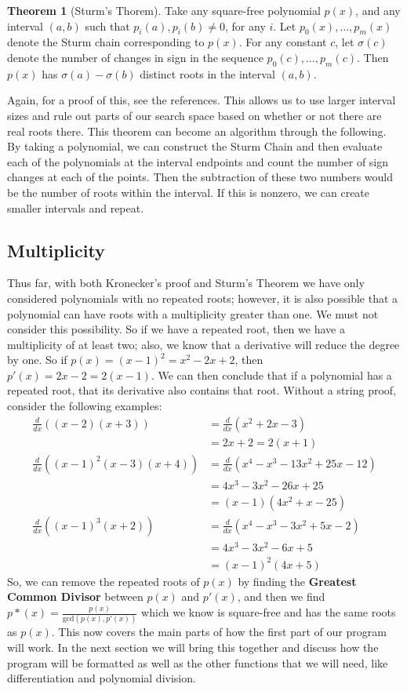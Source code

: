 \documentclass[]{article}
\theoremstyle{definition}
\newtheorem{theorem}{Theorem}[section]
\begin{document}
\begin{theorem}[Sturm's Thorem]
\label{sturm_thm}
Take any square-free polynomial $p(x)$, and any interval $(a, b)$ such that $p_i(a), p_i(b) \neq 0$, for any $i$. Let $p_0(x), \ldots, p_m(x)$ denote the Sturm chain corresponding to $p(x)$. For any constant $c$, let $\sigma(c)$ denote the number of changes in sign in the sequence $p_0(c), \ldots, p_m(c)$. Then $p(x)$ has $\sigma(a) - \sigma(b)$ distinct roots in the interval $(a, b)$.
\end{theorem}
Again, for a proof of this, see the references. This allows us to use larger interval sizes and rule out parts of our search space based on whether or not there are real roots there. This theorem can become an algorithm through the following. By taking a polynomial, we can construct the Sturm Chain and then evaluate each of the polynomials at the interval endpoints and count the number of sign changes at each of the points. Then the subtraction of these two numbers would be the number of roots within the interval. If this is nonzero, we can create smaller intervals and repeat.

\subsection{Multiplicity}
Thus far, with both Kronecker's proof and Sturm's Theorem we have only considered polynomials with no repeated roots; however, it is also possible that a polynomial can have roots with a multiplicity greater than one. We must not consider this possibility. So if we have a repeated root, then we have a multiplicity of at least two; also, we know that a derivative will reduce the degree by one. So if $p(x) = (x - 1)^2 = x^2 - 2x + 2$, then $p'(x) = 2x -2 = 2(x-1)$. We can then conclude that if a polynomial has a repeated root, that its derivative also contains that root. Without a string proof, consider the following examples: 
\begin{align*}
\frac{d}{dx} ((x-2)(x+3)) &= \frac{d}{dx} (x^2 + 2x -3) \\
	&= 2x + 2 = 2(x+1) \\
\frac{d}{dx}((x-1)^2(x-3)(x+4)) &= \frac{d}{dx} (x^4 -x^3 -13x^2 +25x -12) \\ 
	&= 4x^3 -3x^2 -26x + 25 \\
	&= (x-1)(4x^2+x-25) \\
\frac{d}{dx}((x-1)^3(x+2)) &= \frac{d}{dx} (x^4 -x^3 -3x^2 +5x -2) \\
	&= 4x^3 -3x^2 -6x + 5 \\
	&= (x-1)^2(4x+5) 
\end{align*}
So, we can remove the repeated roots of $p(x)$ by finding the \textbf{Greatest Common Divisor} between $p(x)$ and $p'(x)$, and then we find $p*(x) = \frac{p(x)}{\textrm{gcd}(p(x), p'(x))}$ which we know is square-free and has the same roots as $p(x)$. This now covers the main parts of how the first part of our program will work. In the next section we will bring this together and discuss how the program will be formatted as well as the other functions that we will need, like differentiation and polynomial division.
\end{document}
